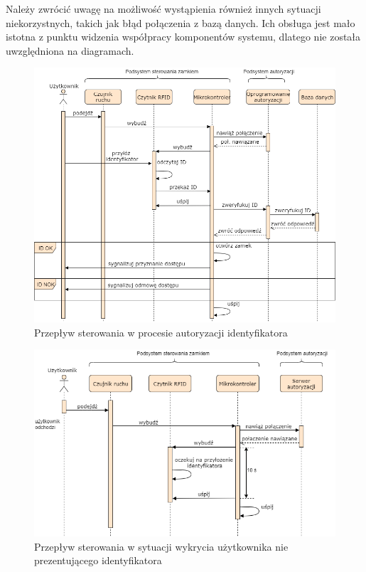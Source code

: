             Należy zwrócić uwagę na możliwość wystąpienia również innych sytuacji niekorzystnych, takich jak błąd połączenia z bazą danych. Ich obsługa jest mało istotna z punktu widzenia współpracy komponentów systemu, dlatego nie została uwzględniona na diagramach.

            \begin{figure}[]
                \includegraphics[width=\linewidth]{chapters/images/sequence1.png}
                \caption{Przepływ sterowania w procesie autoryzacji identyfikatora}
                \label{fig:sequence1}
            \end{figure}

            \begin{figure}[]
                \includegraphics[width=\linewidth]{chapters/images/sequence2.png}
                \caption{Przepływ sterowania w sytuacji wykrycia użytkownika nie prezentującego identyfikatora}
                \label{fig:sequence2}
            \end{figure}

